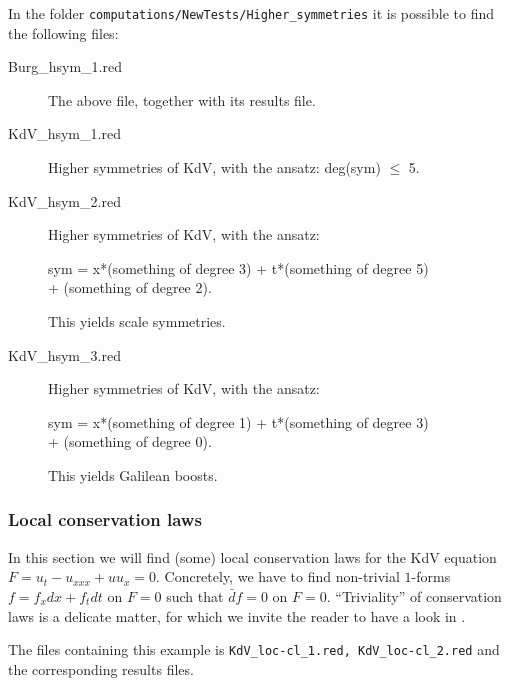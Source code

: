 In the folder \texttt{computations/NewTests/Higher\_symmetries} it is possible
to find the following files:
\begin{description}
\item[Burg\_hsym\_1.red] The above file, together with its results file.
  \item[KdV\_hsym\_1.red] Higher symmetries of KdV, with the ansatz:
    deg(sym) $\leq$ 5.
\item[KdV\_hsym\_2.red] Higher symmetries of KdV, with the ansatz:
  \begin{center}
    sym = x*(something of degree 3) + t*(something of degree  5)\\
  + (something of degree 2).
  \end{center}
    This yields scale symmetries.
\item[KdV\_hsym\_3.red] Higher symmetries of KdV, with the ansatz:
  \begin{center}
    sym = x*(something of degree 1) + t*(something of degree 3)\\
    + (something of degree 0).
  \end{center}
This yields Galilean boosts.
\end{description}

\subsubsection{Local conservation laws}
\label{sec:local-cons-laws}

In this section we will find (some) local conservation laws for the KdV
equation $F=u_t-u_{xxx}+uu_x=0$. Concretely, we have to find non-trivial $1$-forms
$f=f_xdx+f_tdt$ on $F=0$ such that $\bar d f=0$ on $F=0$. ``Triviality'' of
conservation laws is a delicate matter, for which we invite the reader to have
a look in \cite{Krasilshchik:99}.

The files containing this example is \texttt{KdV\_loc-cl\_1.red,
  KdV\_loc-cl\_2.red} and the corresponding results files.

